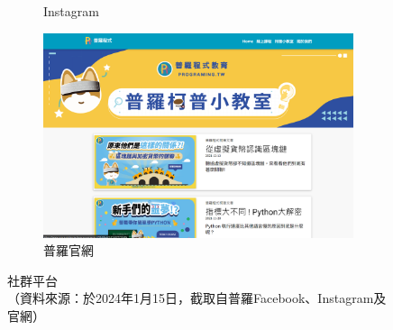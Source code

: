\begin{figure}[H]
\begin{subfigure}{0.32\linewidth}
		\caption{Instagram}
		\label{fig:IG}
	\end{subfigure}
	\begin{subfigure}{0.32\linewidth}
		\centering
		\includegraphics[width=1\textwidth]{images/website.png}
		\caption{普羅官網}
		\label{fig:website}
	\end{subfigure}
	\caption[社群平台]{社群平台\\（資料來源：於2024年1月15日，截取自普羅Facebook、Instagram及官網）}
	\label{fig:platform}
\end{figure}

